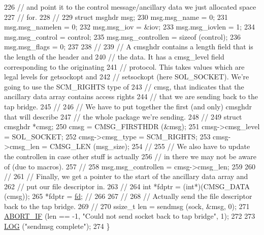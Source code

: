 \begin{DoxyCode}
226   \textcolor{comment}{// and point it to the control message/ancillary data we just allocated space}
227   \textcolor{comment}{// for.}
228   \textcolor{comment}{//}
229   \textcolor{keyword}{struct }msghdr msg;
230   msg.msg\_name = 0;
231   msg.msg\_namelen = 0;
232   msg.msg\_iov = &iov;
233   msg.msg\_iovlen = 1;
234   msg.msg\_control = control;
235   msg.msg\_controllen = \textcolor{keyword}{sizeof} (control);
236   msg.msg\_flags = 0;
237 
238   \textcolor{comment}{//}
239   \textcolor{comment}{// A cmsghdr contains a length field that is the length of the header and}
240   \textcolor{comment}{// the data.  It has a cmsg\_level field corresponding to the originating }
241   \textcolor{comment}{// protocol.  This takes values which are legal levels for getsockopt and}
242   \textcolor{comment}{// setsockopt (here SOL\_SOCKET).  We're going to use the SCM\_RIGHTS type of }
243   \textcolor{comment}{// cmsg, that indicates that the ancillary data array contains access rights }
244   \textcolor{comment}{// that we are sending back to the tap bridge.}
245   \textcolor{comment}{//}
246   \textcolor{comment}{// We have to put together the first (and only) cmsghdr that will describe}
247   \textcolor{comment}{// the whole package we're sending.}
248   \textcolor{comment}{//}
249   \textcolor{keyword}{struct }cmsghdr *cmsg;
250   cmsg = CMSG\_FIRSTHDR (&msg);
251   cmsg->cmsg\_level = SOL\_SOCKET;
252   cmsg->cmsg\_type = SCM\_RIGHTS;
253   cmsg->cmsg\_len = CMSG\_LEN (msg\_size);
254   \textcolor{comment}{//}
255   \textcolor{comment}{// We also have to update the controllen in case other stuff is actually}
256   \textcolor{comment}{// in there we may not be aware of (due to macros).}
257   \textcolor{comment}{//}
258   msg.msg\_controllen = cmsg->cmsg\_len;
259 
260   \textcolor{comment}{//}
261   \textcolor{comment}{// Finally, we get a pointer to the start of the ancillary data array and}
262   \textcolor{comment}{// put our file descriptor in.}
263   \textcolor{comment}{//}
264   \textcolor{keywordtype}{int} *fdptr = (\textcolor{keywordtype}{int}*)(CMSG\_DATA (cmsg));
265   *fdptr = \hyperlink{lte_2model_2fading-traces_2fading__trace__generator_8m_a44f21d5190b5a6df8089f54799628d7e}{fd}; \textcolor{comment}{// }
266 
267   \textcolor{comment}{//}
268   \textcolor{comment}{// Actually send the file descriptor back to the tap bridge.}
269   \textcolor{comment}{//}
270   ssize\_t len = sendmsg (sock, &msg, 0);
271   \hyperlink{tap-creator_8cc_a91c11c90ad2f1672fbd3c031038dce16}{ABORT\_IF} (len == -1, \textcolor{stringliteral}{"Could not send socket back to tap bridge"}, 1);
272 
273   \hyperlink{tap-creator_8cc_a158a8c64f24645c7478298399825737f}{LOG} (\textcolor{stringliteral}{"sendmsg complete"});
274 \}
\end{DoxyCode}


